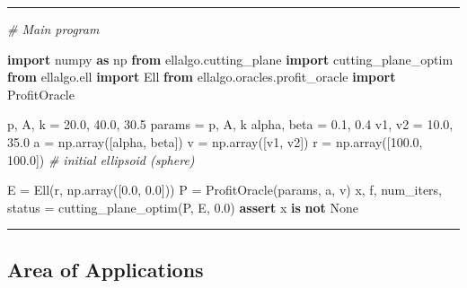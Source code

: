 \documentclass[
]{article}
\newenvironment{Shaded}{}{}
\newcommand{\CommentTok}[1]{\textcolor[rgb]{0.38,0.63,0.69}{\textit{#1}}}
\newcommand{\ControlFlowTok}[1]{\textcolor[rgb]{0.00,0.44,0.13}{\textbf{#1}}}
\newcommand{\FloatTok}[1]{\textcolor[rgb]{0.25,0.63,0.44}{#1}}
\newcommand{\ImportTok}[1]{\textcolor[rgb]{0.00,0.50,0.00}{\textbf{#1}}}
\newcommand{\KeywordTok}[1]{\textcolor[rgb]{0.00,0.44,0.13}{\textbf{#1}}}
\newcommand{\NormalTok}[1]{#1}
\newcommand{\OperatorTok}[1]{\textcolor[rgb]{0.40,0.40,0.40}{#1}}
\newcommand{\VariableTok}[1]{\textcolor[rgb]{0.10,0.09,0.49}{#1}}
\begin{document}
\begin{center}\rule{0.5\linewidth}{0.5pt}\end{center}

\begin{Shaded}
\begin{Highlighting}[]
\CommentTok{\# Main program}

\ImportTok{import}\NormalTok{ numpy }\ImportTok{as}\NormalTok{ np}
\ImportTok{from}\NormalTok{ ellalgo.cutting\_plane }\ImportTok{import}\NormalTok{ cutting\_plane\_optim}
\ImportTok{from}\NormalTok{ ellalgo.ell }\ImportTok{import}\NormalTok{ Ell}
\ImportTok{from}\NormalTok{ ellalgo.oracles.profit\_oracle }\ImportTok{import}\NormalTok{ ProfitOracle}

\NormalTok{p, A, k }\OperatorTok{=} \FloatTok{20.0}\NormalTok{, }\FloatTok{40.0}\NormalTok{, }\FloatTok{30.5}
\NormalTok{params }\OperatorTok{=}\NormalTok{ p, A, k}
\NormalTok{alpha, beta }\OperatorTok{=} \FloatTok{0.1}\NormalTok{, }\FloatTok{0.4}
\NormalTok{v1, v2 }\OperatorTok{=} \FloatTok{10.0}\NormalTok{, }\FloatTok{35.0}
\NormalTok{a }\OperatorTok{=}\NormalTok{ np.array([alpha, beta])}
\NormalTok{v }\OperatorTok{=}\NormalTok{ np.array([v1, v2])}
\NormalTok{r }\OperatorTok{=}\NormalTok{ np.array([}\FloatTok{100.0}\NormalTok{, }\FloatTok{100.0}\NormalTok{])  }\CommentTok{\# initial ellipsoid (sphere)}

\NormalTok{E }\OperatorTok{=}\NormalTok{ Ell(r, np.array([}\FloatTok{0.0}\NormalTok{, }\FloatTok{0.0}\NormalTok{]))}
\NormalTok{P }\OperatorTok{=}\NormalTok{ ProfitOracle(params, a, v)}
\NormalTok{x, f, num\_iters, status }\OperatorTok{=}\NormalTok{ cutting\_plane\_optim(P, E, }\FloatTok{0.0}\NormalTok{)}
\ControlFlowTok{assert}\NormalTok{ x }\KeywordTok{is} \KeywordTok{not} \VariableTok{None}
\end{Highlighting}
\end{Shaded}

\begin{center}\rule{0.5\linewidth}{0.5pt}\end{center}

\subsection{Area of Applications}\label{area-of-applications}
\end{document}
